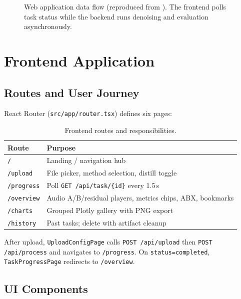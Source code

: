 \begin{figure}[H]
  \centering
  \resizebox{0.98\textwidth}{!}{%
  }
  \caption{Web application data flow (reproduced from ). The frontend polls task status while the backend runs denoising and evaluation asynchronously.}
  \label{fig:web_dataflow_ch8}
\end{figure}

\section{Frontend Application}
\label{sec:frontend}

\subsection{Routes and User Journey}

React Router (\texttt{src/app/router.tsx}) defines six pages:

\begin{table}[H]
  \centering
  \caption{Frontend routes and responsibilities.}
  \label{tab:frontend_routes}
  \small
  \begin{tabular}{ll}
    \toprule
    \textbf{Route} & \textbf{Purpose} \\
    \midrule
    \texttt{/}           & Landing / navigation hub \\
    \texttt{/upload}     & File picker, method selection, distill toggle \\
    \texttt{/progress}   & Poll \texttt{GET /api/task/\{id\}} every 1.5\,s \\
    \texttt{/overview}   & Audio A/B/residual players, metrics chips, ABX, bookmarks \\
    \texttt{/charts}     & Grouped Plotly gallery with PNG export \\
    \texttt{/history}    & Past tasks; delete with artifact cleanup \\
    \bottomrule
  \end{tabular}
\end{table}

After upload, \texttt{UploadConfigPage} calls \texttt{POST /api/upload} then \texttt{POST /api/process} and navigates to \texttt{/progress}. On \texttt{status=completed}, \texttt{TaskProgressPage} redirects to \texttt{/overview}.

\subsection{UI Components}

